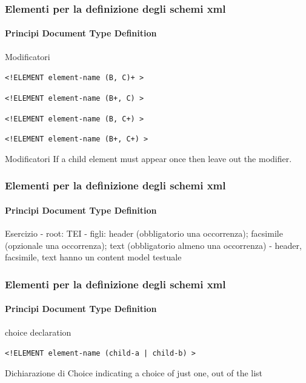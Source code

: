 \begin{frame}
    \frametitle{Elementi per la definizione degli schemi xml}
    \framesubtitle{Principi Document Type Definition}
    \addtocounter{nframe}{1}

    \begin{block}{Modificatori}
        \begin{center} \texttt{<!ELEMENT element-name (B, C)+ >} \end{center}
        \begin{center} \texttt{<!ELEMENT element-name (B+, C) >} \end{center}
        \begin{center} \texttt{<!ELEMENT element-name (B, C+) >} \end{center}
        \begin{center} \texttt{<!ELEMENT element-name (B+, C+) >} \end{center}
    \end{block}

    \begin{block}{Modificatori}
     If a child element must appear once then leave out the modifier.
    \end{block}
\end{frame}

\begin{frame}
    \frametitle{Elementi per la definizione degli schemi xml}
    \framesubtitle{Principi Document Type Definition}
    \addtocounter{nframe}{1}

    \begin{block}{Esercizio}
        - root: TEI
        - figli: header (obbligatorio una occorrenza); facsimile (opzionale una occorrenza); text (obbligatorio almeno una occorrenza)
        - header, facsimile, text hanno un content model testuale
    \end{block}

\end{frame}


\begin{frame}
    \frametitle{Elementi per la definizione degli schemi xml}
    \framesubtitle{Principi Document Type Definition}
    \addtocounter{nframe}{1}

    \begin{block}{choice declaration}
    \begin{center} \texttt{<!ELEMENT element-name (child-a | child-b) >} \end{center}
    \end{block}

    \begin{block}{Dichiarazione di Choice}
        indicating a choice of just one, out of the list
    \end{block}

\end{frame}


